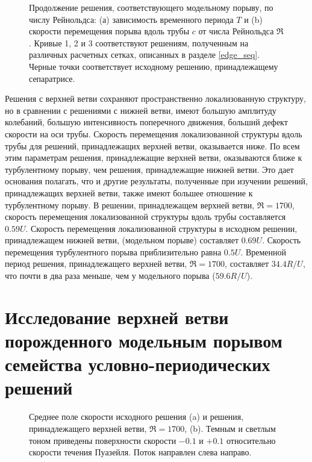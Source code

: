 \begin{figure}
\caption{Продолжение решения, соответствующего модельному порыву, по числу Рейнольдса: (а) зависимость временного периода $T$ и (b) скорости перемещения порыва вдоль трубы $c$ от числа Рейнольдса $\Re$. Кривые 1, 2 и 3 соответствуют решениям, полученным на различных расчетных сетках, описанных в разделе \ref{edge_seq}. Черные точки соответствует исходному решению, принадлежащему сепаратрисе.}
\label{local_contin_pic}
\end{figure}

Решения с верхней ветви сохраняют пространственно локализованную структуру, но в сравнении с решениями с нижней ветви, имеют большую амплитуду колебаний, большую интенсивность поперечного движения, больший дефект скорости на оси трубы. Скорость перемещения локализованной структуры вдоль трубы для решений, принадлежащих верхней ветви, оказывается ниже. По всем этим параметрам решения, принадлежащие верхней ветви, оказываются ближе к турбулентному порыву, чем решения, принадлежащие нижней ветви. Это дает основания полагать, что и другие результаты, полученные при изучении решений, принадлежащих верхней ветви, также имеют большее отношение к турбулентному порыву. В решении, принадлежащем верхней ветви, $\Re = 1700$, скорость перемещения локализованной структуры вдоль трубы составляется $0.59U$. Скорость перемещения локализованной структуры в исходном решении, принадлежащем нижней ветви, (модельном порыве) составляет $0.69U$. Скорость перемещения турбулентного порыва приблизительно равна $0.5U$. Временной период решения, принадлежащего верхней ветви, $\Re = 1700$, составляет $34.4 R/U$, что почти в два раза меньше, чем у модельного порыва ($59.6R/U$). 

\section{Исследование верхней ветви порожденного модельным порывом семейства условно-периодических решений}

\begin{figure}
\caption{Среднее поле скорости исходного решения (a) и решения, принадлежащего верхней ветви, $\Re=1700$, (b). Темным и светлым тоном приведены поверхности скорости $-0.1$ и $+0.1$ относительно скорости течения Пуазейля. Поток направлен слева направо.}
\label{3D_contin_cmp_pic}
\end{figure}


